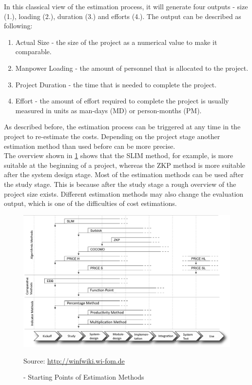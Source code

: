 In this classical view of the estimation process, it will generate four outputs - size (1.), loading (2.), duration (3.) and efforts (4.). The output can be described as following:
\begin{enumerate}
	\item Actual Size - the size of the project as a numerical value to make it comparable.
	\item Manpower Loading - the amount of personnel that is allocated to the project.
	\item Project Duration - the time that is needed to complete the project.
	\item Effort - the amount of effort required to complete the project is usually measured in units as man-days (MD) or person-months (PM).
\end{enumerate}
As described before, the estimation process can be triggered at any time in the project to re-estimate the costs. Depending on the project stage another estimation method than used before can be more precise.\\
The overview shown in \ref{fig:estimationMethodInStage} shows that the SLIM method, for example, is more suitable at the beginning of a project, whereas the ZKP method is more suitable after the system design stage. Most of the estimation methods can be used after the study stage. This is because after the study stage a rough overview of the project size exists. Different estimation methods may also change the evaluation output, which is one of the difficulties of cost estimations.\\
\begin{figure}[h] 
	\centering 
	\includegraphics[width=13cm]{images/Einsatzzeitpunkte2.PNG} 
	\caption{- Starting Points of Estimation Methods} 
	Source: \url{http://winfwiki.wi-fom.de}
	\label{fig:estimationMethodInStage}
\end{figure}\\

